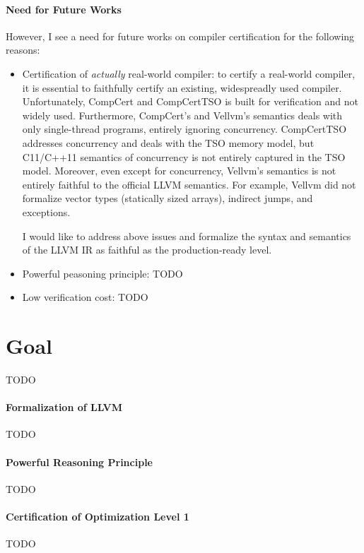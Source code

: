 \documentclass[nocopyrightspace]{sigplanconf}
\begin{document}
\paragraph{Need for Future Works}
However, I see a need for future works on compiler certification for
the following reasons:
\begin{itemize}
\item Certification of \emph{actually} real-world compiler: to certify
  a real-world compiler, it is essential to faithfully certify an
  existing, widespreadly used compiler.  Unfortunately, CompCert and
  CompCertTSO is built for verification and not widely used.
  Furthermore, CompCert's and Vellvm's semantics deals with only
  single-thread programs, entirely ignoring concurrency.  CompCertTSO
  addresses concurrency and deals with the TSO memory model, but
  C11/C++11 semantics of concurrency is not entirely captured in the
  TSO model.  Moreover, even except for concurrency, Vellvm's
  semantics is not entirely faithful to the official LLVM semantics.
  For example, Vellvm did not formalize vector types (statically sized
  arrays), indirect jumps, and exceptions.  

  I would like to address above issues and formalize the syntax and
  semantics of the LLVM IR as faithful as the production-ready level.

\item Powerful peasoning principle: TODO

\item Low verification cost: TODO

\end{itemize}

\section{Goal}
TODO

\paragraph{Formalization of LLVM}
TODO

\paragraph{Powerful Reasoning Principle}
TODO

\paragraph{Certification of Optimization Level 1}
TODO
\end{document}
